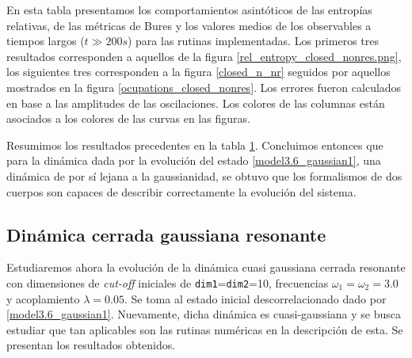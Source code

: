 \documentclass{report} %
\numberwithin{equation}{section}
\begin{document}
\begin{table}
\begin{tabular}{llllll}
        \bottomrule
     \end{tabular} 
    \begin{tablenotes}
      \small
      \item En esta tabla presentamos los comportamientos asintóticos de las entropías relativas, de las métricas de Bures y los valores medios de los observables a tiempos largos ($t \gg 200s$) para las rutinas implementadas. Los primeros tres resultados corresponden a aquellos de la figura \ref{rel_entropy_closed_nonres.png}, los siguientes tres corresponden a la figura \ref{closed_n_nr} seguidos por aquellos mostrados en la figura \ref{ocupations_closed_nonres}. Los errores fueron calculados en base a las amplitudes de las oscilaciones. Los colores de las columnas están asociados a los colores de las curvas en las figuras. 
    \end{tablenotes}
    \label{table1}
\end{table}

Resumimos los resultados precedentes en la tabla \ref{table1}. Concluimos entonces que para la dinámica dada por la evolución del estado \eqref{model3.6_gaussian1}, una dinámica de por sí lejana a la gaussianidad, se obtuvo que los formalismos de dos cuerpos son capaces de describir correctamente la evolución del sistema.

\subsection{Dinámica cerrada gaussiana resonante}
\label{bxb_cr}

Estudiaremos ahora la evolución de la dinámica cuasi gaussiana cerrada resonante con dimensiones de \textit{cut-off} iniciales de \texttt{dim1}=\texttt{dim2}=10, frecuencias $\omega_1 = \omega_2 = 3.0$ y acoplamiento $\lambda = 0.05$. Se toma al estado inicial descorrelacionado dado por \eqref{model3.6_gaussian1}. Nuevamente, dicha dinámica es cuasi-gaussiana y se busca estudiar que tan aplicables son las rutinas numéricas en la descripción de esta. Se presentan los resultados obtenidos. 
\end{document}
